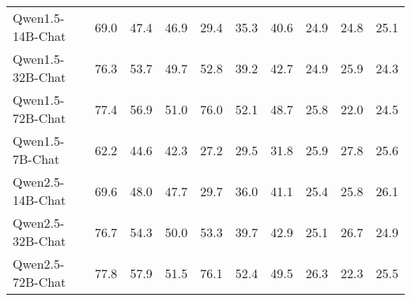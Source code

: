 \begin{table*}[]
\begin{tabular}{l|ccc|ccc|ccc}
         Qwen1.5-14B-Chat\cite{bai2023qwentechnicalreport} & 69.0 & 47.4 & 46.9 & 29.4 & 35.3 & 40.6 & 24.9 & 24.8 & 25.1 \\
         Qwen1.5-32B-Chat\cite{bai2023qwentechnicalreport} & 76.3 & 53.7 & 49.7 & 52.8 & 39.2 & 42.7 & 24.9 & 25.9 & 24.3\\
         Qwen1.5-72B-Chat\cite{bai2023qwentechnicalreport} & 77.4 & 56.9 & 51.0 & 76.0 & 52.1 & 48.7 & 25.8 & 22.0 & 24.5 \\
         Qwen1.5-7B-Chat\cite{bai2023qwentechnicalreport} & 62.2 & 44.6 & 42.3 & 27.2 & 29.5 & 31.8 & 25.9 & 27.8 & 25.6 \\
         Qwen2.5-14B-Chat\cite{qwen2.5} & 69.6 & 48.0 & 47.7 & 29.7 & 36.0 & 41.1 & 25.4 & 25.8 & 26.1 \\
         Qwen2.5-32B-Chat\cite{qwen2.5} & 76.7 & 54.3 & 50.0 & 53.3 & 39.7 & 42.9 & 25.1 & 26.7 & 24.9 \\
         Qwen2.5-72B-Chat\cite{qwen2.5} & 77.8 & 57.9 & 51.5 & 76.1 & 52.4 & 49.5 & 26.3 & 22.3 & 25.5 \\
         \bottomrule
         
    \end{tabular}
    \label{tab:t32}
\end{table*}